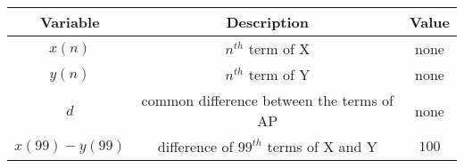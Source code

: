 
      \begin{tabular}{|c|c|c|} 
      \hline
\textbf{Variable}& \textbf{Description}& \textbf{Value}\\\hline
         $x(n)$& $n^{th}$ term of X&none\\\hline
          $y(n)$& $n^{th}$ term of Y&none\\\hline
          $d$&common difference between the terms of AP&none\\\hline
          $x(99)-y(99)$& difference of $99^{th}$ terms of X and Y &$100$ \\ \hline
         
    \end{tabular}

